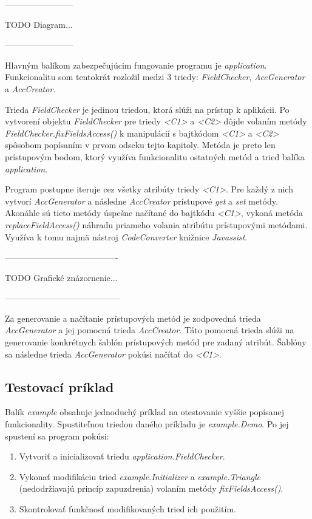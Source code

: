 \documentclass[11pt,final,oneside]{fithesis}
\begin{document}
------------------------

TODO Diagram...

------------------------

Hlavným balíkom zabezpečujúcim fungovanie programu je \textit{application}. 
Funkcionalitu som tentokrát rozložil medzi 3 triedy: \textit{FieldChecker}, 
\textit{AccGenerator} a \textit{AccCreator}.

Trieda \textit{FieldChecker} je jedinou triedou, ktorá slúži na prístup k 
aplikácii. Po vytvorení objektu \textit{FieldChecker} pre triedy \textit{<C1>} 
a \textit{<C2>} dôjde volaním metódy \textit{FieldChecker.fixFieldsAccess()} k 
manipulácií s bajtkódom \textit{<C1>} a \textit{<C2>} spôsobom popísaním v 
prvom odseku tejto kapitoly. Metóda je preto len prístupovým bodom, ktorý 
využíva funkcionalitu ostatných metód a tried balíka \textit{application}.

Program postupne iteruje cez všetky atribúty triedy \textit{<C1>}. Pre každý 
z nich vytvorí \textit{AccGenerator} a následne \textit{AccCreator} prístupové
\textit{get} a \textit{set} metódy. Akonáhle sú tieto metódy úspešne načítané 
do bajtkódu \textit{<C1>}, vykoná metóda \textit{replaceFieldAccess()} náhradu 
priameho volania atribútu prístupovými metódami. Využíva k tomu najmä nástroj 
\textit{CodeConverter} knižnice \textit{Javassist}.

\textit{}

----------------------------------------

TODO Grafické znázornenie...

-----------------------------------------

Za generovanie a načítanie prístupových metód je zodpovedná trieda 
\textit{AccGenerator} a jej pomocná trieda \textit{AccCreator}. Táto pomocná 
trieda slúži na generovanie konkrétnych šablón prístupových metód pre zadaný 
atribút. Šablóny sa následne trieda \textit{AccGenerator} pokúsi načítať do
\textit{<C1>}.

\subsection{Testovací príklad}
Balík \textit{example} obsahuje jednoduchý príklad na otestovanie vyššie 
popísanej funkcionality. Spustiteľnou triedou daného príkladu je 
\textit{example.Demo}. Po jej spustení sa program pokúsi:

\begin{enumerate}
\item Vytvoriť a inicializovať triedu \textit{application.FieldChecker}.
\item Vykonať modifikáciu tried \textit{example.Initializer} a 
\textit{example.Triangle} (nedodržiavajú princíp zapuzdrenia) volaním metódy 
\textit{fixFieldsAccess()}.
\item Skontrolovať funkčnosť modifikovaných tried ich použitím.
\end{enumerate}
\end{document}
